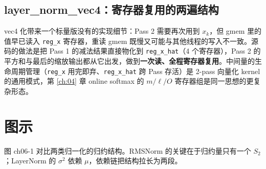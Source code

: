 \subsection{layer\_norm\_vec4：寄存器复用的两遍结构}



vec4 化带来一个标量版没有的实现细节：Pass 2 需要再次用到 $x_k$，但 gmem 里的值早已读入 \texttt{reg\_x} 寄存器，重读 gmem 既慢又可能与其他线程的写入不一致。源码的做法是把 Pass 1 的减法结果直接物化到 \texttt{reg\_x\_hat}（4 个寄存器），Pass 2 的平方和与最后的缩放输出都从它出发，做到\textbf{一次读、全程寄存器复用}。中间量的生命周期管理（\texttt{reg\_x} 用完即弃、\texttt{reg\_x\_hat} 跨 Pass 存活）是 2-pass 向量化 kernel 的通用模式，第 \ref{ch:04} 章 online softmax 的 $m/\ell/O$ 寄存器组是同一思想的更复杂形态。

\section{图示}

图 ch06-1 对比两类归一化的归约结构。RMSNorm 的关键在于归约量只有一个 $S_2$；LayerNorm 的 $\sigma^2$ 依赖 $\mu$，依赖链把结构拉长为两段。

